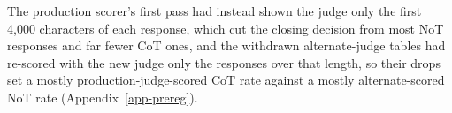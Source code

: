 The production scorer's
first pass had instead shown the judge only the first 4,000 characters of
each response, which cut the closing decision from most NoT responses and
far fewer CoT ones, and the withdrawn alternate-judge tables had re-scored
with the new judge only the responses over that length, so their drops set a
mostly production-judge-scored CoT rate against a mostly alternate-scored NoT rate
(Appendix~\ref{app-prereg}).

